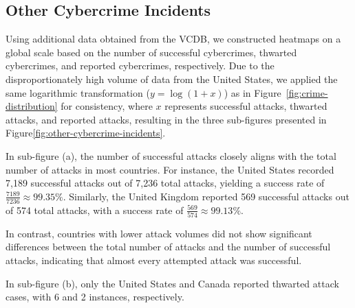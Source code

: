 \subsection{Other Cybercrime Incidents}\label{subsec:other-cybercrime-incedents} %
	Using additional data obtained from the VCDB,
	we constructed heatmaps on a global scale based on the number of successful cybercrimes, thwarted cybercrimes, and reported cybercrimes, respectively.
	Due to the disproportionately high volume of data from the United States,
	we applied the same logarithmic transformation (\( y = \log(1 + x) \)) as in Figure~\ref{fig:crime-distribution} for consistency,
	where $x$ represents successful attacks, thwarted attacks, and reported attacks,
	resulting in the three sub-figures presented in Figure\ref{fig:other-cybercrime-incidents}.

	In sub-figure (a), the number of successful attacks closely aligns with the total number of attacks in most countries.
	For instance, the United States recorded 7,189 successful attacks out of 7,236 total attacks,
	yielding a success rate of \( \frac{7189}{7236} \approx 99.35\% \).
	Similarly, the United Kingdom reported 569 successful attacks out of 574 total attacks,
	with a success rate of \( \frac{569}{574} \approx 99.13\% \).

	In contrast, countries with lower attack volumes did not show significant differences between the total number of attacks and the number of successful attacks,
	indicating that almost every attempted attack was successful.

	In sub-figure (b), only the United States and Canada reported thwarted attack cases, with 6 and 2 instances, respectively.

